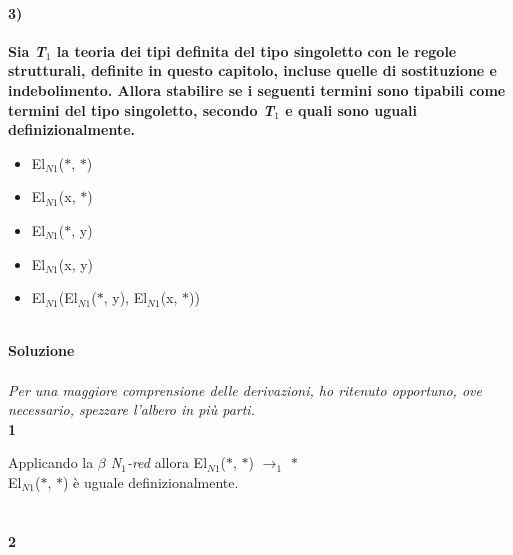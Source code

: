 \paragraph{3)} \textbf{Sia \textit{T$_1$} la teoria dei tipi definita del tipo singoletto con le regole strutturali, definite in questo capitolo, incluse quelle di sostituzione e indebolimento. Allora stabilire se i seguenti termini sono tipabili come termini del tipo singoletto, secondo \textit{T$_1$} e quali sono uguali definizionalmente.}
\begin{itemize}
\item El$_{N1}$($\ast$, $\ast$)
\item El$_{N1}$(x, $\ast$)
\item El$_{N1}$($\ast$, y)
\item El$_{N1}$(x, y)
\item El$_{N1}$(El$_{N1}$($\ast$, y), El$_{N1}$(x, $\ast$))
\end{itemize}
\noindent
\\
\textbf{Soluzione}\\\\
\textit{Per una maggiore comprensione delle derivazioni, ho ritenuto opportuno, ove necessario, spezzare l'albero in pi\`u parti.}\\
\noindent
\textbf{1}\\
\small
\begin{prooftree}
\end{prooftree}
\normalsize
Applicando la \textit{$\beta$ N$_1$-red} allora El$_{N1}$($\ast$, $\ast$) $\rightarrow_1$ $\ast$ \\
El$_{N1}$($\ast$, $\ast$) \`e uguale definizionalmente.
\\\\\\
\noindent
\textbf{2}\\
\scriptsize
\begin{prooftree}
\end{prooftree}

